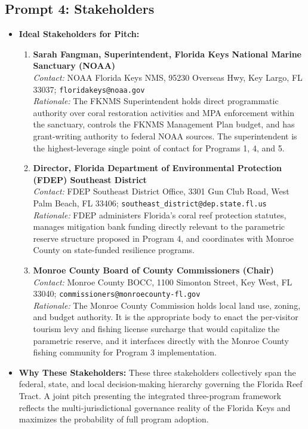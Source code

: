 \documentclass[10pt,letterpaper]{article}
\begin{document}
\subsection*{Prompt 4: Stakeholders}
\begin{itemize}
    \item \textbf{Ideal Stakeholders for Pitch:}
    \begin{enumerate}
        \item \textbf{Sarah Fangman, Superintendent, Florida Keys National Marine Sanctuary (NOAA)}\\
        \textit{Contact:} NOAA Florida Keys NMS, 95230 Overseas Hwy, Key Largo, FL 33037; \texttt{floridakeys@noaa.gov}\\
        \textit{Rationale:} The FKNMS Superintendent holds direct programmatic authority over coral restoration activities and MPA enforcement within the sanctuary, controls the FKNMS Management Plan budget, and has grant-writing authority to federal NOAA sources. The superintendent is the highest-leverage single point of contact for Programs 1, 4, and 5.

        \item \textbf{Director, Florida Department of Environmental Protection (FDEP) Southeast District}\\
        \textit{Contact:} FDEP Southeast District Office, 3301 Gun Club Road, West Palm Beach, FL 33406; \texttt{southeast\_district@dep.state.fl.us}\\
        \textit{Rationale:} FDEP administers Florida's coral reef protection statutes, manages mitigation bank funding directly relevant to the parametric reserve structure proposed in Program 4, and coordinates with Monroe County on state-funded resilience programs.

        \item \textbf{Monroe County Board of County Commissioners (Chair)}\\
        \textit{Contact:} Monroe County BOCC, 1100 Simonton Street, Key West, FL 33040; \texttt{commissioners@monroecounty-fl.gov}\\
        \textit{Rationale:} The Monroe County Commission holds local land use, zoning, and budget authority. It is the appropriate body to enact the per-visitor tourism levy and fishing license surcharge that would capitalize the parametric reserve, and it interfaces directly with the Monroe County fishing community for Program 3 implementation.
    \end{enumerate}
    \item \textbf{Why These Stakeholders:} These three stakeholders collectively span the federal, state, and local decision-making hierarchy governing the Florida Reef Tract. A joint pitch presenting the integrated three-program framework reflects the multi-jurisdictional governance reality of the Florida Keys and maximizes the probability of full program adoption.
\end{itemize}
\end{document}
